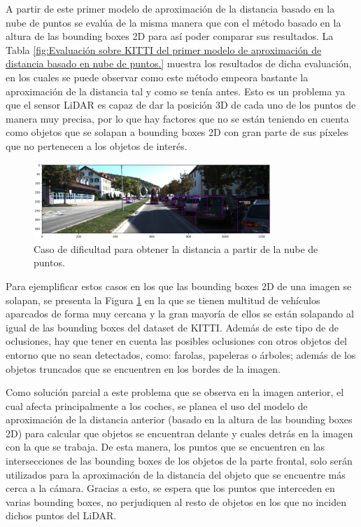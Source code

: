 A partir de este primer modelo de aproximación de la distancia basado en la nube de puntos se evalúa de la misma manera que con el método basado en la altura de las bounding boxes 2D para así poder comparar sus resultados. La Tabla \ref{fig:Evaluación sobre KITTI del primer modelo de aproximación de distancia basado en nube de puntos.} muestra los resultados de dicha evaluación, en los cuales se puede observar como este método empeora bastante la aproximación de la distancia tal y como se tenía antes. Esto es un problema ya que el sensor \ac{LiDAR} es capaz de dar la posición 3D de cada uno de los puntos de manera muy precisa, por lo que hay factores que no se están teniendo en cuenta como objetos que se solapan a bounding boxes 2D con gran parte de sus píxeles que no pertenecen a los objetos de interés.

\begin{figure}[H]
    \centering
    \includegraphics[width=0.8\textwidth]{Book/figures/6_approx_distancia/bb2d_kitti2.png}
    \caption{Caso de dificultad para obtener la distancia a partir de la nube de puntos.}
    \label{fig:Caso de dificultad para obtener la distancia a partir de la nube de puntos.}
\end{figure}

Para ejemplificar estos casos en los que las bounding boxes 2D de una imagen se solapan, se presenta la Figura \ref{fig:Caso de dificultad para obtener la distancia a partir de la nube de puntos.} en la que se tienen multitud de vehículos aparcados de forma muy cercana y la gran mayoría de ellos se están solapando al igual de las bounding boxes del dataset de KITTI. Además de este tipo de de oclusiones, hay que tener en cuenta las posibles oclusiones con otros objetos del entorno que no sean detectados, como: farolas, papeleras o árboles; además de los objetos truncados que se encuentren en los bordes de la imagen.

Como solución parcial a este problema que se observa en la imagen anterior, el cual afecta principalmente a los coches, se planea el uso del modelo de aproximación de la distancia anterior (basado en la altura de las bounding boxes 2D) para calcular que objetos se encuentran delante y cuales detrás en la imagen con la que se trabaja. De esta manera, los puntos que se encuentren en las intersecciones de las bounding boxes de los objetos de la parte frontal, solo serán utilizados para la aproximación de la distancia del objeto que se encuentre más cerca a la cámara. Gracias a esto, se espera que los puntos que interceden en varias bounding boxes, no perjudiquen al resto de objetos en los que no inciden dichos puntos del \ac{LiDAR}.

